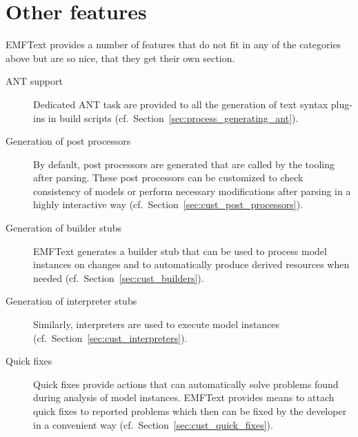 \section{Other features}

EMFText provides a number of features that do not fit in any of the categories 
above but are so nice, that they get their own section.

\begin{description}

  \item[ANT support]
        Dedicated ANT task are provided to all the generation of text syntax 
        plug-ins in build scripts (cf.~Section~\ref{sec:process_generating_ant}).
        
  \item[Generation of post processors]
        By default, post processors are generated that are called by the 
        tooling after parsing. These post processors can be customized to
        check consistency of models or perform necessary modifications after
        parsing in a highly interactive way (cf.~Section~\ref{sec:cust_post_processors}).

  \item[Generation of builder stubs]
        EMFText generates a builder stub that can be used to process 
        model instances on changes and to automatically produce derived 
        resources when needed (cf.~Section~\ref{sec:cust_builders}).
        
  \item[Generation of interpreter stubs]
        Similarly, interpreters are used to execute model instances 
        (cf.~Section~\ref{sec:cust_interpreters}).
  
  \item[Quick fixes]
        Quick fixes provide actions that can automatically solve problems found during
        analysis of model instances. EMFText provides means to attach quick fixes to
        reported problems which then can be fixed by the developer in a convenient way 
        (cf.~Section~\ref{sec:cust_quick_fixes}).
      
\end{description}
